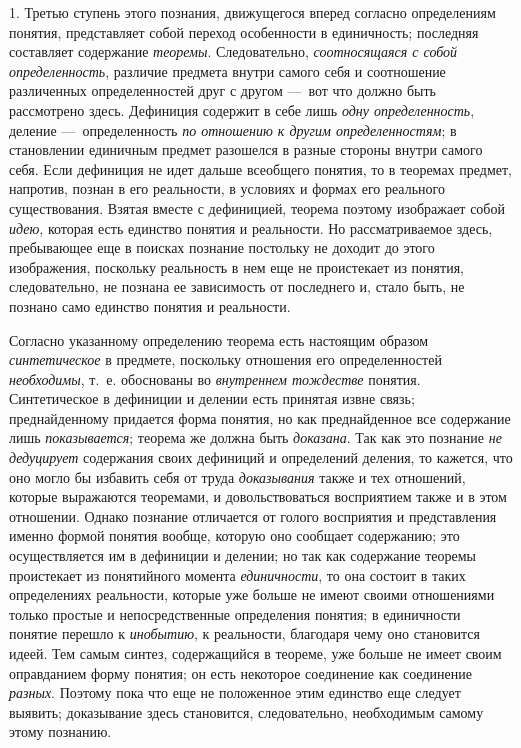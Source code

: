 \documentclass[twoside]{article}
\begin{document}
1. Третью ступень этого познания, движущегося вперед согласно
определениям понятия, представляет собой переход особенности в единичность;
последняя составляет содержание
{\em теоремы}.
Следовательно,
{\em соотносящаяся с собой
определенность}, различие предмета внутри самого себя и
соотношение различенных определенностей друг с другом —~вот
что должно быть рассмотрено здесь. Дефиниция содержит в себе лишь
{\em одну определенность},
деление —~определенность
{\em по отношению к другим
определенностям}; в становлении единичным предмет разошелся
в разные стороны внутри самого себя. Если дефиниция не идет дальше
всеобщего понятия, то в теоремах предмет, напротив, познан в его
реальности, в условиях и формах его реального существования. Взятая вместе
с дефиницией, теорема поэтому изображает собой
{\em идею}, которая есть
единство понятия и реальности. Но рассматриваемое здесь, пребывающее еще в
поисках познание постольку не доходит до этого изображения, поскольку
реальность в нем еще не проистекает из понятия, следовательно, не познана
ее зависимость от последнего и, стало быть, не познано само единство
понятия и реальности.

Согласно указанному определению теорема есть настоящим образом
{\em синтетическое} в
предмете, поскольку отношения его определенностей
{\em необходимы}, т.~е.
обоснованы во {\em внутреннем
тождестве} понятия. Синтетическое в дефиниции и делении есть
принятая извне связь; преднайденному придается форма понятия, но как
преднайденное все содержание лишь
{\em показывается};
теорема же должна быть
{\em доказана}. Так как
это познание {\em не дедуцирует}
содержания своих дефиниций и определений деления, то кажется,
что оно могло бы избавить себя от труда
{\em доказывания} также и
тех отношений, которые выражаются теоремами, и довольствоваться восприятием
также и в этом отношении. Однако познание отличается от голого восприятия и
представления именно формой понятия вообще, которую оно сообщает
содержанию; это осуществляется им в дефиниции и делении; но так как
содержание теоремы проистекает из понятийного момента
{\em единичности}, то она
состоит в таких определениях реальности, которые уже больше не имеют своими
отношениями только простые и непосредственные определения понятия; в
единичности понятие перешло к
{\em инобытию}, к
реальности, благодаря чему оно становится идеей. Тем самым синтез,
содержащийся в теореме, уже больше не имеет своим оправданием форму
понятия; он есть некоторое соединение как соединение
{\em разных}. Поэтому
пока что еще не положенное этим единство еще следует выявить; доказывание
здесь становится, следовательно, необходимым самому этому познанию.
\end{document}
